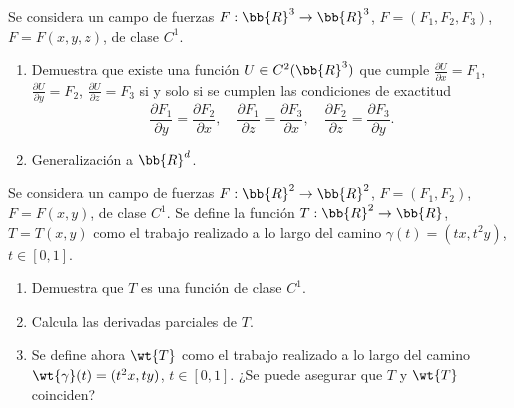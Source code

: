 \begin{ejercicio}
    Se considera un campo de fuerzas $F : \bb{R}^3 \to \bb{R}^3$, $F = (F_1, F_2, F_3)$, $F = F(x, y, z)$, de clase $C^1$.
    \begin{enumerate}
        \item Demuestra que existe una función $U \in C^2(\bb{R}^3)$ que cumple $\frac{\partial U}{\partial x} = F_1$,
        $\frac{\partial U}{\partial y} = F_2$, $\frac{\partial U}{\partial z} = F_3$ si y solo si se cumplen
        las condiciones de exactitud
        \[
            \frac{\partial F_1}{\partial y} = \frac{\partial F_2}{\partial x}, \quad
            \frac{\partial F_1}{\partial z} = \frac{\partial F_3}{\partial x}, \quad
            \frac{\partial F_2}{\partial z} = \frac{\partial F_3}{\partial y}.
        \]
        \item Generalización a $\bb{R}^d$.
    \end{enumerate}
\end{ejercicio}

\begin{ejercicio}
    Se considera un campo de fuerzas $F : \bb{R}^2 \to \bb{R}^2$, $F = (F_1, F_2)$, $F = F(x, y)$, de clase $C^1$. Se define la función
    $T : \bb{R}^2 \to \bb{R}$, $T = T(x, y)$ como el trabajo realizado a lo largo del camino $\gamma(t) = (tx, t^2y)$, $t \in [0, 1]$.
    \begin{enumerate}
        \item Demuestra que $T$ es una función de clase $C^1$.
        \item Calcula las derivadas parciales de $T$.
        \item Se define ahora $\wt{T}$ como el trabajo realizado a lo largo del camino $\wt{\gamma}(t) = (t^2x, ty)$, $t \in [0, 1]$. ¿Se puede asegurar
        que $T$ y $\wt{T}$ coinciden?
    \end{enumerate}
\end{ejercicio}